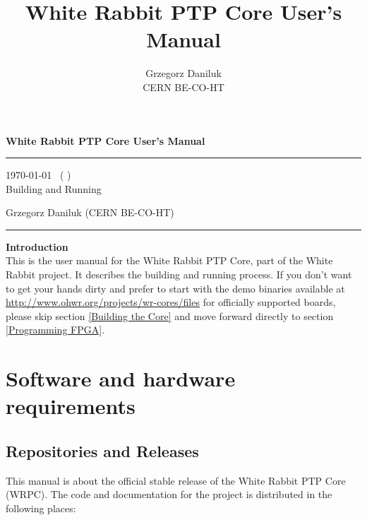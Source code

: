 \documentclass[a4paper, 12pt]{article}
\begin{document}
\title{White Rabbit PTP Core User's Manual}
\author{Grzegorz Daniluk\\ CERN BE-CO-HT}

\raggedright
{\LARGE {\bf White Rabbit PTP Core User's Manual}}\\[0.2 cm]
\hrule height 4pt \vspace{0.1cm}
\raggedleft
{\large \today ~ ( )}\\
{\large Building and Running}\\
\vspace*{\fill}
\raggedright
{\large Grzegorz Daniluk (CERN BE-CO-HT)}\\
\hrule height 2pt
\justify

\newpage

\tableofcontents

\newpage

{\noindent \LARGE {\bf Introduction}}\\


This is the user manual for the White Rabbit PTP Core, part of the White
Rabbit project. It describes the building and running process. If you don't
want to get your hands dirty and prefer to start with the demo binaries
available at \url{http://www.ohwr.org/projects/wr-cores/files} for officially
supported boards, please skip section \ref{Building the Core} and move forward
directly to section \ref{Programming FPGA}.


\section{Software and hardware requirements}
\label{Software and hardware requirements}

\subsection{Repositories and Releases}
\label{Repositories and Releases}

This manual is about the official  stable release of the White
Rabbit PTP Core (WRPC).  The code and documentation for the project is
distributed in the following places:
\end{document}
